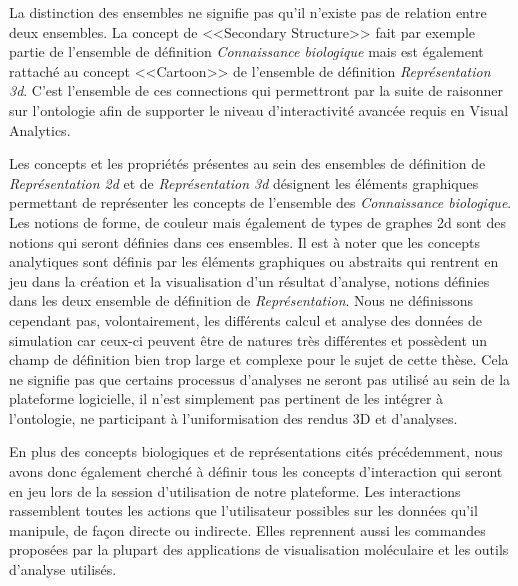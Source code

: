 La distinction des ensembles ne signifie pas qu'il n'existe pas de relation entre deux ensembles. La concept de <<Secondary Structure>> fait par exemple partie de l'ensemble de définition \textit{Connaissance biologique} mais est également rattaché au concept <<Cartoon>> de l'ensemble de définition \textit{Représentation 3d}. C'est l'ensemble de ces connections qui permettront par la suite de raisonner sur l'ontologie afin de supporter le niveau d'interactivité avancée requis en Visual Analytics.

Les concepts et les propriétés présentes au sein des ensembles de définition de \textit{Représentation 2d} et de \textit{Représentation 3d} désignent les éléments graphiques permettant de représenter les concepts de l'ensemble des \textit{Connaissance biologique}. Les notions de forme, de couleur mais également de types de graphes 2d sont des notions qui seront définies dans ces ensembles.  Il est à noter que les concepts analytiques sont définis par les éléments graphiques ou abstraits qui rentrent en jeu dans la création et la visualisation d'un résultat d'analyse, notions définies dans les deux ensemble de définition de \textit{Représentation}. Nous ne définissons cependant pas, volontairement, les différents calcul et analyse des données de simulation car ceux-ci peuvent être de natures très différentes et possèdent un champ de définition bien trop large et complexe pour le sujet de cette thèse. Cela ne signifie pas que certains processus d'analyses ne seront pas utilisé au sein de la plateforme logicielle, il n'est simplement pas pertinent de les intégrer à l'ontologie, ne participant à l'uniformisation des rendus 3D et d'analyses.

En plus des concepts biologiques et de représentations cités précédemment, nous avons donc également cherché à définir tous les concepts d'interaction qui seront en jeu lors de la session d'utilisation de notre plateforme. Les interactions rassemblent toutes les actions que l'utilisateur possibles sur les données qu'il manipule, de façon directe ou indirecte. Elles reprennent aussi les commandes proposées par la plupart des applications de visualisation moléculaire et les outils d'analyse utilisés.

